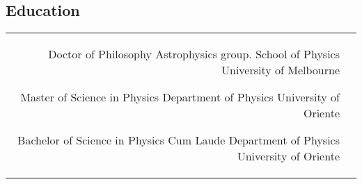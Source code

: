 \documentclass[10pt]{article} %
\begin{document}
\begin{paracol}{2}

\section{Education} 





\begin{supertabular}{rl} %

	
	{Doctor of Philosophy} %
	{} %
	{Astrophysics group. School of Physics} %
	{University of Melbourne} %
	
	
	{Master of Science in Physics} %
	{} %
	{Department of Physics} %
	{University of Oriente} %
	
	
	{Bachelor of Science in Physics} %
	{Cum Laude} %
	{Department of Physics} %
	{University of Oriente} %
	

\end{supertabular}



\end{paracol}
\end{document}
